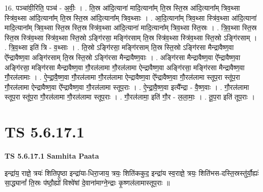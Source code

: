 \documentclass[17pt]{extarticle}
\begin{document}
16. पञ्चा॑वी॒रिति॒ पञ्च॑ - अ॒वीः॒ । . ति॒स्र आ॑दि॒त्याना॑ मादि॒त्याना᳚म् ति॒स्र स्ति॒स्र आ॑दि॒त्याना᳚म् त्रिव॒थ्सा स्त्रि॑व॒थ्सा आ॑दि॒त्याना᳚म् ति॒स्र स्ति॒स्र आ॑दि॒त्याना᳚म् त्रिव॒थ्साः । . आ॒दि॒त्याना᳚म् त्रिव॒थ्सा स्त्रि॑व॒थ्सा आ॑दि॒त्याना॑ मादि॒त्याना᳚म् त्रिव॒थ्सा स्ति॒स्र स्ति॒स्र स्त्रि॑व॒थ्सा आ॑दि॒त्याना॑ मादि॒त्याना᳚म् त्रिव॒थ्सा स्ति॒स्रः । . त्रि॒व॒थ्सा स्ति॒स्र स्ति॒स्र स्त्रि॑व॒थ्सा स्त्रि॑व॒थ्सा स्ति॒स्रो ऽङ्गि॑रसा॒ मङ्गि॑रसाम् ति॒स्र स्त्रि॑व॒थ्सा स्त्रि॑व॒थ्सा स्ति॒स्रो ऽङ्गि॑रसाम् । . त्रि॒व॒थ्सा इति॑ त्रि - व॒थ्साः । . ति॒स्रो ऽङ्गि॑रसा॒ मङ्गि॑रसाम् ति॒स्र स्ति॒स्रो ऽङ्गि॑रसा मैन्द्रावैष्ण॒वा ऐ᳚न्द्रावैष्ण॒वा अङ्गि॑रसाम् ति॒स्र स्ति॒स्रो ऽङ्गि॑रसा मैन्द्रावैष्ण॒वाः । . अङ्गि॑रसा मैन्द्रावैष्ण॒वा ऐ᳚न्द्रावैष्ण॒वा अङ्गि॑रसा॒ मङ्गि॑रसा मैन्द्रावैष्ण॒वा गौ॒रल॑लामा गौ॒रल॑लामा ऐन्द्रावैष्ण॒वा अङ्गि॑रसा॒ मङ्गि॑रसा मैन्द्रावैष्ण॒वा गौ॒रल॑लामाः । . ऐ॒न्द्रा॒वै॒ष्ण॒वा गौ॒रल॑लामा गौ॒रल॑लामा ऐन्द्रावैष्ण॒वा ऐ᳚न्द्रावैष्ण॒वा गौ॒रल॑लामा स्तूप॒रा स्तू॑प॒रा गौ॒रल॑लामा ऐन्द्रावैष्ण॒वा ऐ᳚न्द्रावैष्ण॒वा गौ॒रल॑लामा स्तूप॒राः । . ऐ॒न्द्रा॒वै॒ष्ण॒वा इत्यै᳚न्द्रा - वै॒ष्ण॒वाः । . गौ॒रल॑लामा स्तूप॒रा स्तू॑प॒रा गौ॒रल॑लामा गौ॒रल॑लामा स्तूप॒राः । . गौ॒रल॑लामा॒ इति॑ गौ॒र - ल॒ला॒माः॒ । . तू॒प॒रा इति॑ तूप॒राः । \newline
\pagebreak
{}

\section{ TS 5.6.17.1 }

\textbf{TS 5.6.17.1 } \newline
\textbf{Samhita Paata} \newline

इन्द्रा॑य॒ राज्ञे॒ त्रयः॑ शितिपृ॒ष्ठा इन्द्रा॑या-धिरा॒जाय॒ त्रयः॒ शिति॑ककुद॒ इन्द्रा॑य स्व॒राज्ञे॒ त्रयः॒ शिति॑भस-दस्ति॒स्रस्तु॑र्यौ॒ह्यः॑ सा॒द्ध्यानां᳚ ति॒स्रः प॑ष्ठौ॒ह्यो॑ विश्वे॑षां दे॒वाना॑माग्ने॒न्द्राः कृ॒ष्णल॑लामास्तूप॒राः ॥ \newline
\end{document}
